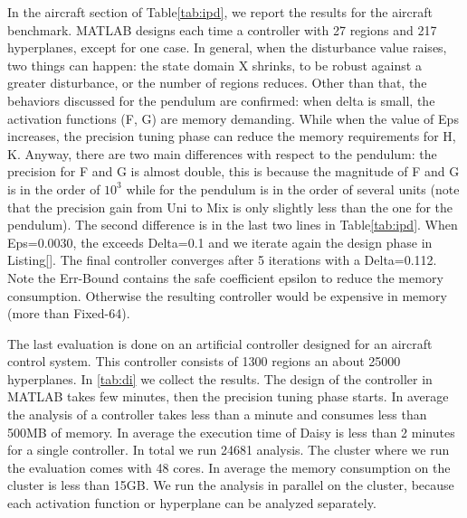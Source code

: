 In the aircraft section of Table\ref{tab:ipd}, we report the results for the aircraft benchmark.
MATLAB designs each time a controller with 27 regions and 217 hyperplanes, except for one case. In general, when the disturbance value raises, two things can happen: the state domain X shrinks, to be robust against a greater disturbance, or the number of regions reduces.
Other than that, the behaviors discussed for the pendulum are confirmed: when delta is small, the activation functions (F, G) are memory demanding. While when the value of Eps increases, the precision tuning phase can reduce the memory requirements for H, K. Anyway, there are two main differences with respect to the pendulum: the precision for F and G is almost double, this is because the magnitude of F and G is in the order of $10^{3}$ while for the pendulum is in the order of several units (note that the precision gain from Uni to Mix is only slightly less than the one for the pendulum). The second difference is in the last two lines in Table\ref{tab:ipd}.
When Eps=0.0030, the \maxUij exceeds Delta=0.1 and we iterate again the design phase in Listing\ref{}. The final controller converges after 5 iterations with a Delta=0.112. Note the Err-Bound contains the safe coefficient epsilon to reduce the memory consumption. Otherwise the resulting controller would be expensive in memory (more than Fixed-64).

The last evaluation is done on an artificial controller designed for an aircraft control system.
This controller consists of 1300 regions an about 25000 hyperplanes. In \ref{tab:di} we collect the results.
The design of the controller in MATLAB takes few minutes, then the precision tuning phase starts. In average the analysis of a controller takes less than a minute and consumes less than 500MB of memory. In average the execution time of Daisy is less than 2 minutes for a single controller. In total we run 24681 analysis. The cluster where we run the evaluation comes with 48 cores. In average the memory consumption on the cluster is less than 15GB. We run the analysis in parallel on the cluster, because each activation function or hyperplane can be analyzed separately.



